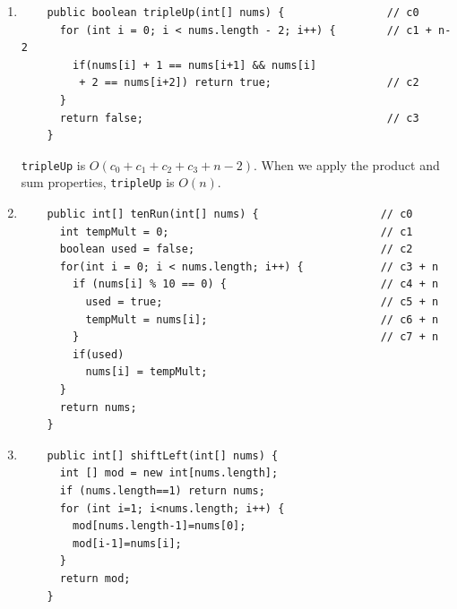 \documentclass[a4paper,12pt]{article}
\begin{document}
\begin{enumerate}
    \item \begin{Verbatim}
    public boolean tripleUp(int[] nums) {                // c0
      for (int i = 0; i < nums.length - 2; i++) {        // c1 + n-2
        if(nums[i] + 1 == nums[i+1] && nums[i]
         + 2 == nums[i+2]) return true;                  // c2
      }
      return false;                                      // c3
    }
    \end{Verbatim}
    \texttt{tripleUp} is $O(c_0+c_1+c_2+c_3+n-2)$. When we apply the product
    and sum properties, \texttt{tripleUp} is $O(n)$.

    \item \begin{Verbatim}
    public int[] tenRun(int[] nums) {                   // c0
      int tempMult = 0;                                 // c1
      boolean used = false;                             // c2
      for(int i = 0; i < nums.length; i++) {            // c3 + n
        if (nums[i] % 10 == 0) {                        // c4 + n
          used = true;                                  // c5 + n
          tempMult = nums[i];                           // c6 + n
        }                                               // c7 + n
        if(used)
          nums[i] = tempMult;
      }
      return nums;
    }
    \end{Verbatim}

    \item \begin{Verbatim}
    public int[] shiftLeft(int[] nums) {
      int [] mod = new int[nums.length];
      if (nums.length==1) return nums;
      for (int i=1; i<nums.length; i++) {
        mod[nums.length-1]=nums[0];
        mod[i-1]=nums[i];
      }
      return mod;
    }
    \end{Verbatim}
    \end{enumerate}
\end{document}
